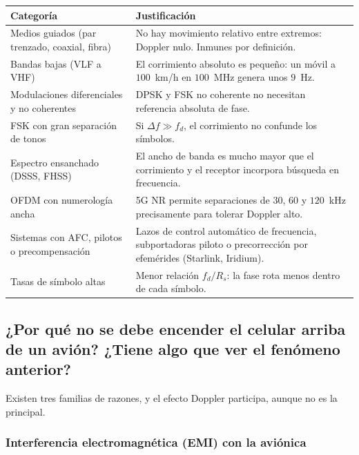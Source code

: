 \documentclass[12pt,a4paper]{article}
\begin{document}
\begin{center}
\begin{tabular}{p{} p{}}
\hline
\textbf{Categoría} & \textbf{Justificación} \\
\hline
Medios guiados (par trenzado, coaxial, fibra) & No hay movimiento relativo entre extremos: Doppler nulo. Inmunes por definición. \\
Bandas bajas (VLF a VHF) & El corrimiento absoluto es pequeño: un móvil a $100$~km/h en $100$~MHz genera unos $9$~Hz. \\
Modulaciones diferenciales y no coherentes & DPSK y FSK no coherente no necesitan referencia absoluta de fase. \\
FSK con gran separación de tonos & Si $\Delta f \gg f_d$, el corrimiento no confunde los símbolos. \\
Espectro ensanchado (DSSS, FHSS) & El ancho de banda es mucho mayor que el corrimiento y el receptor incorpora búsqueda en frecuencia. \\
OFDM con numerología ancha & 5G NR permite separaciones de $30$, $60$ y $120$~kHz precisamente para tolerar Doppler alto. \\
Sistemas con AFC, pilotos o precompensación & Lazos de control automático de frecuencia, subportadoras piloto o precorrección por efemérides (Starlink, Iridium). \\
Tasas de símbolo altas & Menor relación $f_d / R_s$: la fase rota menos dentro de cada símbolo. \\
\hline
\end{tabular}
\end{center}

\subsection{¿Por qué no se debe encender el celular arriba de un avión? ¿Tiene algo que ver el fenómeno anterior?}

Existen tres familias de razones, y el efecto Doppler participa, aunque no es la principal.

\subsubsection*{Interferencia electromagnética (EMI) con la aviónica}
\end{document}
